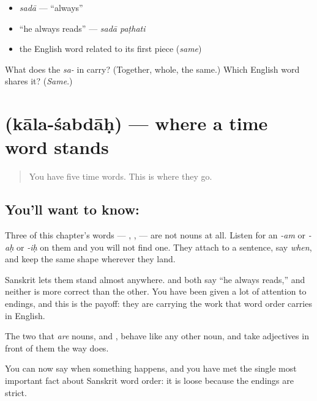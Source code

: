 \begin{itemize}
\raggedright
  \item \emph{sadā} — \textquotedblleft{}always\textquotedblright{}
  \item \textquotedblleft{}he always reads\textquotedblright{} — \emph{sadā paṭhati}
  \item the English word related to its first piece (\emph{same})
\end{itemize}

\begin{tcolorbox}[breakable,colback=teal!4,colframe=teal!35!black,title={Before you move on}]
What does the \emph{sa-} in  carry? (Together, whole, the same.) Which English word shares it? (\emph{Same}.)
\end{tcolorbox}
\section[\texorpdfstring{\sk{कालशब्दाः} (kāla-śabdāḥ)}{कालशब्दाः (kāla-śabdāḥ)}]{ (kāla-śabdāḥ) — where a time word stands}

\label{lesson:SA-C17-time-words}



\begin{quote}
You have five time words. This is where they go.
\end{quote}

\subsection*{You'll want to know: }
Three of this chapter's words — , ,  — are not nouns at all. Listen for an \emph{-am} or \emph{-aḥ} or \emph{-iḥ} on them and you will not find one. They attach to a sentence, say \emph{when}, and keep the same shape wherever they land.

Sanskrit lets them stand almost anywhere.   and   both say \textquotedblleft{}he always reads,\textquotedblright{} and neither is more correct than the other. You have been given a lot of attention to endings, and this is the payoff: they are carrying the work that word order carries in English.

The two that \emph{are} nouns,  and , behave like any other noun, and take adjectives in front of them the way  does.

\begin{grammarlens}[title={What you've built}]
You can now say when something happens, and you have met the single most important fact about Sanskrit word order: it is loose because the endings are strict.
\end{grammarlens}

